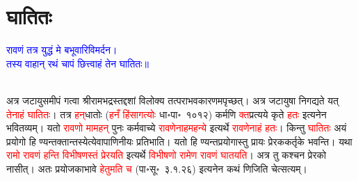 \section[घातितः]{घातितः}
\centering\textcolor{blue}{रावणं तत्र युद्धं मे बभूवारिविमर्दन।\nopagebreak\\
तस्य वाहान् रथं चापं छित्त्वाहं तेन घातितः॥}\nopagebreak\\
\\
\begin{sloppypar}\justifying\noindent\hspace{10mm} अत्र जटायु\-समीपं गत्वा श्रीरामभद्रस्तद्दशां विलोक्य तत्पराभव\-कारणमपृच्छत्। अत्र जटायुषा निगद्यते यत् \textcolor{red}{तेनाहं घातितः}। तत्र \textcolor{red}{हन्‌}\-धातोः (\textcolor{red}{हनँ हिंसागत्योः} धा॰पा॰~१०१२) कर्मणि \textcolor{red}{क्त}\-प्रत्यये कृते \textcolor{red}{हतः} इत्यनेन भवितव्यम्। यतो \textcolor{red}{रावणो मामहन्} पुनः कर्म\-वाच्ये \textcolor{red}{रावणेनाहमहन्ये} इत्यर्थे \textcolor{red}{रावणेनाहं हतः}। किन्तु \textcolor{red}{घातितः} अयं प्रयोगो हि ण्यन्त\-क्तान्तस्येत्येवापाणिनीयः प्रतिभाति। यतो हि ण्यन्त\-प्रयोगास्तु प्रायः प्रेरक\-कर्तृके भवन्ति। यथा \textcolor{red}{रामो रावणं हन्ति विभीषणस्तं प्रेरयति} इत्यर्थे \textcolor{red}{विभीषणो रामेण रावणं घातयति}। अत्र तु कश्चन प्रेरको नासीत्। अतः प्रयोजकाभावे \textcolor{red}{हेतुमति च} (पा॰सू॰~३.१.२६) इत्यनेन कथं णिजिति चेत्सत्यम्।

\end{sloppypar}
